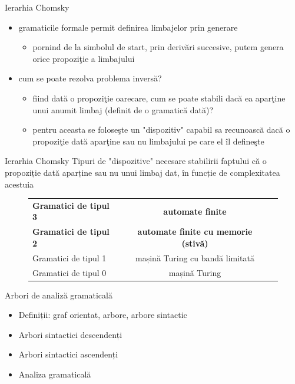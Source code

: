 \documentclass[pdf]{beamer}
\begin{document}
\begin{frame}{Ierarhia Chomsky}
\begin{itemize}
\item
gramaticile formale permit definirea limbajelor prin generare
\begin{itemize}
\item
pornind de la simbolul de start, prin derivări succesive, putem genera orice propoziţie a limbajului 
\end{itemize}
\item
cum se poate rezolva problema inversă? 
\begin{itemize}
\item
fiind dată o propoziţie oarecare, cum se poate stabili dacă ea aparţine unui anumit limbaj (definit de o gramatică dată)?
\item
pentru aceasta se foloseşte un "dispozitiv" capabil sa recunoască dacă o propoziţie dată aparţine sau nu limbajului pe care el îl defineşte
\end{itemize}
\end{itemize}
\end{frame}



\begin{frame}{Ierarhia Chomsky}
Tipuri de "dispozitive" necesare stabilirii faptului că o propoziție dată aparține sau nu unui limbaj dat, în funcție de complexitatea acestuia\\

\begin{figure}
\begin{tabular}{ l | c | r | } 
\hline 
\textbf{Gramatici de tipul 3} & \textbf{automate finite} \\ 
\textbf{Gramatici de tipul 2} & \textbf{automate finite cu memorie (stivă)} \\ 
Gramatici de tipul 1 & mașină Turing cu bandă limitată \\ 
Gramatici de tipul 0 & mașină Turing \\ 
\hline 
\end{tabular}
\end{figure}
\end{frame}



\begin{frame}{Arbori de analiză gramaticală}
\begin{itemize}
\item
Definiții: graf orientat, arbore, arbore sintactic
\item
Arbori sintactici descendenți
\item
Arbori sintactici ascendenți
\item
Analiza gramaticală
\end{itemize}
\end{frame}
\end{document}
